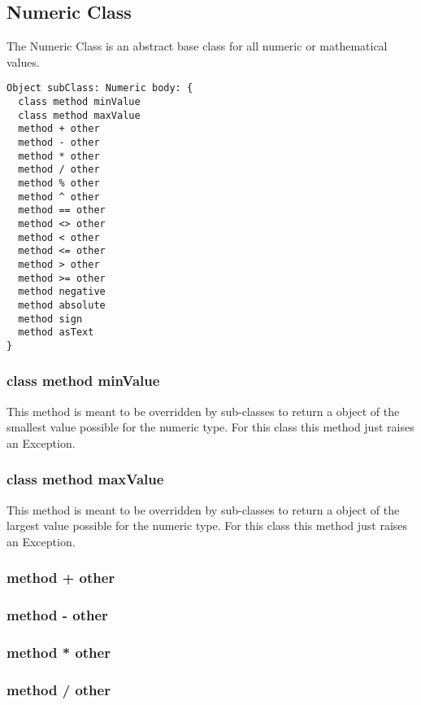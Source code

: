 \subsection{Numeric Class}

The Numeric Class is an abstract base class for all numeric or mathematical values.

\begin{lstlisting}
Object subClass: Numeric body: {
  class method minValue
  class method maxValue
  method + other
  method - other
  method * other
  method / other
  method % other
  method ^ other
  method == other
  method <> other
  method < other
  method <= other
  method > other
  method >= other
  method negative
  method absolute
  method sign
  method asText
}
\end{lstlisting}

\subsubsection{class method minValue}
This method is meant to be overridden by sub-classes to return a object of the smallest value possible for the numeric type. For this class this method just raises an Exception.

\subsubsection{class method maxValue}
This method is meant to be overridden by sub-classes to return a object of the largest value possible for the numeric type. For this class this method just raises an Exception.

\subsubsection{method + other}

\subsubsection{method - other}

\subsubsection{method * other}

\subsubsection{method / other}

